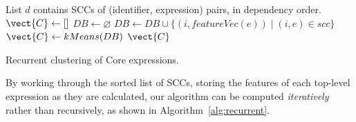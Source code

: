 \begin{algorithm}
  \begin{algorithmic}[1]
    \Require List $d$ contains SCCs of (identifier, expression) pairs, in
    dependency order.
      \State $\vect{C} \gets []$
      \State $DB \gets \varnothing$
        \State $DB \gets DB \cup \{(i, featureVec(e)) \mid (i, e) \in scc\}$
        \State $\vect{C} \gets kMeans(DB)$
      \EndFor
      \Return $\vect{C}$
    \EndProcedure
  \end{algorithmic}
  \caption{Recurrent clustering of Core expressions.}
  \label{alg:recurrent}
\end{algorithm}

By working through the sorted list of SCCs, storing the features of each
top-level expression as they are calculated, our algorithm can be computed
\emph{iteratively} rather than recursively, as shown in
Algorithm~\ref{alg:recurrent}.


